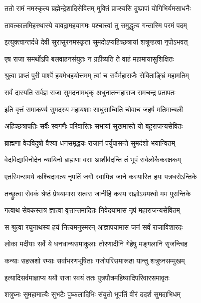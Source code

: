 \twolineshloka
{ततो रामं नमस्कृत्य ब्रह्मेन्द्रेशादिसेवितम्}
{मुक्तिं प्राप्स्यसि दुष्प्रापां योगिभिर्यमसाधनैः}%

\twolineshloka
{तावत्कालमिहस्थास्ये यावद्रामहयागमः}
{पश्चात्त्वां तु समुद्धृत्य गन्तास्मि परमं पदम्}%

\twolineshloka
{इत्युक्त्वान्तर्दधे देवी सुरासुरनमस्कृता}
{सुमदोऽप्यहिच्छत्रायां शत्रून्हत्वा नृपोऽभवत्}%

\twolineshloka
{एष राजा समर्थोऽपि बलवाहनसंयुतः}
{न ग्रहीष्यति ते वाहं महामायासुशिक्षितः}%

\twolineshloka
{श्रुत्वा प्राप्तं पुरी पार्श्वे हयमेधहयोत्तमम्}
{त्वां च सर्वैर्महाराजैः सेविताङ्घ्रिं महामतिम्}%

\twolineshloka
{सर्वं दास्यति सर्वज्ञ राजा सुमदनामधृक्}
{अधुनातन्महाराज रामचन्द्र प्रतापतः}%


\twolineshloka
{इति वृत्तं समाकर्ण्य सुमदस्य महायशाः}
{साधुसाध्विति चोवाच जहर्ष मतिमान्बली}%

\twolineshloka
{अहिच्छत्रापतिः सर्वैः स्वगणैः परिवारितः}
{सभायां सुखमास्ते यो बहुराजन्यसेवितः}%

\twolineshloka
{ब्राह्मणा वेदविदुषो वैश्या धनसमृद्धयः}
{राजानं पर्युपासन्ते सुमदंशो भयान्वितम्}%

\twolineshloka
{वेदविद्याविनोदेन न्यायिनो ब्राह्मणा वराः}
{आशीर्वदन्ति तं भूपं सर्वलोकैकरक्षकम्}%

\twolineshloka
{एतस्मिन्समये कश्चिदागत्य नृपतिं जगौ}
{स्वामिन्न जाने कस्यास्ति हयः पत्रधरोऽन्तिके}%

\twolineshloka
{तच्छ्रुत्वा सेवकं श्रेष्ठं प्रेषयामास सत्वरः}
{जानीहि कस्य राज्ञोऽयमश्वो मम पुरान्तिके}%

\twolineshloka
{गत्वाथ सेवकस्तत्र ज्ञात्वा वृत्तान्तमादितः}
{निवेदयामास नृपं महाराजन्यसेवितम्}%

\twolineshloka
{स श्रुत्वा रघुनाथस्य हयं नित्यमनुस्मरन्}
{आज्ञापयामास जनं सर्वं राजाविशारदः}%

\twolineshloka
{लोका मदीयाः सर्वे ये धनधान्यसमाकुलाः}
{तोरणादीनि गेहेषु मङ्गलानि सृजन्त्विह}%

\twolineshloka
{कन्याः सहस्रशो रम्याः सर्वाभरणभूषिताः}
{गजोपरिसमारूढा यान्तु शत्रुघ्नसम्मुखम्}%

\twolineshloka
{इत्यादिसर्वमाज्ञाप्य ययौ राजा स्वयं ततः}
{पुत्रपौत्रमहिष्यादिपरिवारसमावृतः}%

\twolineshloka
{शत्रुघ्नः सुमहामात्यैः सुभटैः पुष्कलादिभिः}
{संयुतो भूपतिं वीरं ददर्श सुमदाभिधम्}%

